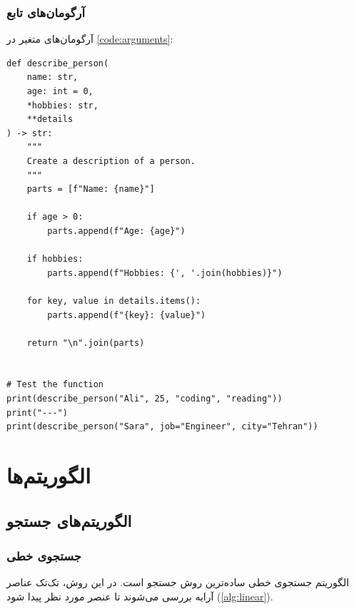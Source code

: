 \documentclass{matinbook}
\begin{document}
\section{آرگومان‌های تابع}
\label{sec:functions-arguments}

آرگومان‌های متغیر در \cref{code:arguments}:

\begin{latin}
\begin{verbatim}
def describe_person(
    name: str,
    age: int = 0,
    *hobbies: str,
    **details
) -> str:
    """
    Create a description of a person.
    """
    parts = [f"Name: {name}"]

    if age > 0:
        parts.append(f"Age: {age}")

    if hobbies:
        parts.append(f"Hobbies: {', '.join(hobbies)}")

    for key, value in details.items():
        parts.append(f"{key}: {value}")

    return "\n".join(parts)


# Test the function
print(describe_person("Ali", 25, "coding", "reading"))
print("---")
print(describe_person("Sara", job="Engineer", city="Tehran"))
\end{verbatim}
\end{latin}
\label{code:arguments}

\part{الگوریتم‌ها}

\chapter{الگوریتم‌های جستجو}
\label{chap:search}

\section{جستجوی خطی}
\label{sec:search-linear}

الگوریتم جستجوی خطی
ساده‌ترین روش جستجو است. در این روش، تک‌تک عناصر
آرایه بررسی می‌شوند تا عنصر مورد نظر پیدا شود
(\cref{alg:linear}).
\end{document}
